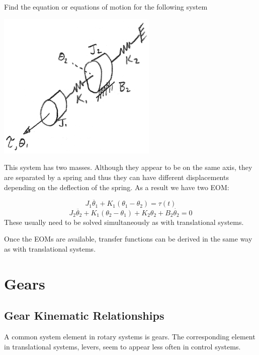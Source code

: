 \begin{ExampleSmall}
Find the equation or equations of motion for the following system

\includegraphics[width=3.0in]{figs03/00743a.png}

This system has two masses.  Although they appear to be on the same axis, they are separated by a spring and thus they can have different displacements depending on the deflection of the spring.  As a result we have two EOM:

\[
J_1\ddot{\theta_1} + K_1(\theta_1 - \theta_2) = \tau(t)
\]
\[
J_2\ddot{\theta_2} + K_1(\theta_2 - \theta_1) + K_2\theta_2 + B_2\dot{\theta_2} = 0
\]
These usually need to be solved simultaneously as with translational systems.

\end{ExampleSmall}

Once the EOMs are available, transfer functions can be derived in the same way as with translational systems.

\section{Gears}
%

\subsection{Gear Kinematic Relationships}\label{gearkinematics}

A common system element in rotary systems is gears.
The corresponding element in translational systems, levers, seem to appear less often in control systems.

